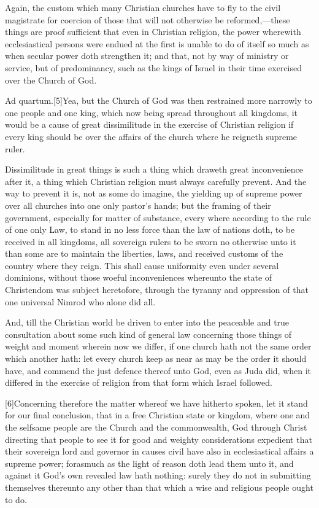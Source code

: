 Again, the custom which many Christian churches have to fly to the civil magistrate for coercion of those that will not otherwise be reformed,—these things are proof sufficient that even in Christian religion, the power wherewith ecclesiastical persons were endued at the first is unable to do of itself so much as when secular power doth strengthen it; and that,  not by way of ministry or service, but of predominancy, such as the kings of Israel in their time exercised over the Church of God.

Ad quartum.[5]Yea, but the Church of God was then restrained more narrowly to one people and one king, which now being spread throughout all kingdoms, it would be a cause of great dissimilitude in the exercise of Christian religion if every king should be over the affairs of the church where he reigneth supreme ruler.

Dissimilitude in great things is such a thing which draweth great inconvenience after it, a thing which Christian religion must always carefully prevent. And the way to prevent it is, not as some do imagine, the yielding up of supreme power over all churches into one only pastor’s hands; but the framing of their government, especially for matter of substance, every where according to the rule of one only Law, to stand in no less force than the law of nations doth, to be received in all kingdoms, all sovereign rulers to be sworn no otherwise unto it than some are to maintain the liberties, laws, and received customs of the country where they reign. This shall cause uniformity even under several dominions, without those woeful inconveniences whereunto the state of Christendom was subject heretofore, through the tyranny and oppression of that one universal Nimrod who alone did all.

And, till the Christian world be driven to enter into the peaceable and true consultation about some such kind of general law concerning those things of weight and moment wherein now we differ, if one church hath not the same order which another hath: let every church keep as near as may be the order it should have, and commend the just defence thereof unto God, even as Juda did, when it differed in the exercise of religion from that form which Israel followed.

[6]Concerning therefore the matter whereof we have hitherto spoken, let it stand for our final conclusion, that in a free Christian state or kingdom, where one and the selfsame people are the Church and the commonwealth, God through  Christ directing that people to see it for good and weighty considerations expedient that their sovereign lord and governor in causes civil have also in ecclesiastical affairs a supreme power; forasmuch as the light of reason doth lead them unto it, and against it God’s own revealed law hath nothing: surely they do not in submitting themselves thereunto any other than that which a wise and religious people ought to do.


